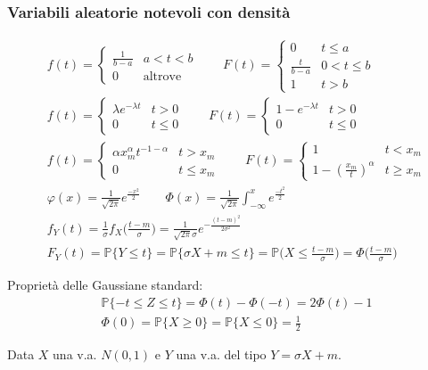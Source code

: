 \subsubsection{Variabili aleatorie notevoli con densità}
\begin{align}
	& f(t)=\begin{cases}
		\frac{1}{b-a} & a<t<b\\
		0 & \text{altrove}
	\end{cases} \quad\quad
	F(t) = \begin{cases}
		0 & t \leq a \\
		\frac{t}{b-a} & 0 < t \leq b \\
		1 & t >b
	\end{cases} \tag{Uniformi su intervalli} \\
	& f(t)=\begin{cases}
			\lambda e^{-\lambda t} & t>0\\
			0 & t \leq 0
		\end{cases} \quad\quad
		F(t) = \begin{cases}
			1 - e^{-\lambda t} & t>0\\
			0 & t\leq 0
		\end{cases} \tag{Esponenziali} \\
		& f(t)=\begin{cases}
			\alpha x_m^\alpha t^{-1-\alpha} & t>x_m\\
			0 & t \leq x_m
		\end{cases} \quad\quad
		F(t) = \begin{cases}
			1 & t< x_m \\
			1 - (\frac{x_m}{t})^\alpha & t\geq x_m
		\end{cases} \tag{Pareto} \\
		& \varphi(x) = \frac{1}{\sqrt{2 \pi}} e^{\frac{-x^2}{2}} \quad\quad
		\Phi(x) = \frac{1}{\sqrt{2\pi}} \int_{-\infty}^{x}e^{\frac{-t^2}{2}} \tag{Gaussiane standard $N(0,1)$} \\
		&  f_Y(t) = \frac{1}{\sigma}f_X\bigg(\frac{t-m}{\sigma}\bigg) = \frac{1}{\sqrt{2 \pi}\sigma} e^{-\frac{(t-m)^2}{2 \sigma^2}} \tag{Gaussiane non standard $N(m, \sigma^2)$}\\
		& F_Y(t) = \mathbb{P}\{Y \leq t\} = \mathbb{P}\{\sigma X + m \leq t\} = \mathbb{P}\bigg(X \leq \frac{t-m}{\sigma}\bigg) = \Phi \bigg(\frac{t-m}{\sigma}\bigg) \tag{Gaussiane non standard 2}
\end{align}

\begin{proposition}
	Proprietà delle Gaussiane standard:
	\begin{align}
		& \mathbb{P}\{-t \leq Z \leq t\} = \Phi(t) - \Phi(-t) = 2\Phi(t)-1 \\
		& \Phi(0) = \mathbb{P}\{X \geq 0\} = \mathbb{P} \{X \leq 0\} = \frac{1}{2}
	\end{align}
\end{proposition}
\begin{definition}
	Data $X$ una v.a. $N(0,1)$ e $Y$ una v.a. del tipo $Y = \sigma X + m$.

\end{definition}

